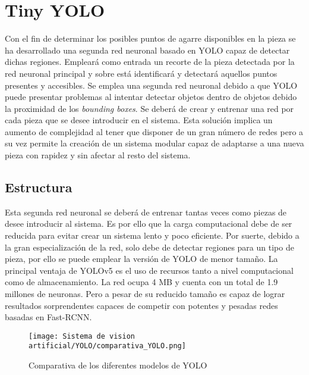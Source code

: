 \newpage
\section{Tiny YOLO}
\label{chap:Sistema de visión artificial sec:Tiny YOLO}
Con el fin de determinar los posibles puntos de agarre disponibles en la pieza se ha desarrollado una segunda red neuronal basado en YOLO capaz de detectar dichas regiones. Empleará como entrada un recorte de la pieza detectada por la red neuronal principal y sobre está identificará y detectará aquellos puntos presentes y accesibles. Se emplea una segunda red neuronal debido a que YOLO puede presentar problemas al intentar detectar objetos dentro de objetos debido  la proximidad de los \textit{bounding boxes}. Se deberá de crear y entrenar una red por cada pieza que se desee introducir en el sistema. Esta solución implica un aumento de complejidad al tener que disponer de un gran número de redes pero a su vez permite la creación de un sistema modular capaz de adaptarse a una nueva pieza con rapidez y sin afectar al resto del sistema.

\subsection{Estructura}
\label{chap:Sistema de visión artificial subsec:Tiny YOLO Estructura}
Esta segunda red neuronal se deberá de entrenar tantas veces como piezas de desee introducir al sistema. Es por ello que la carga computacional debe de ser reducida para evitar crear un sistema lento y poco eficiente. Por suerte, debido a la gran especialización de la red, solo debe de detectar regiones para un tipo de pieza, por ello se puede emplear la versión de YOLO de menor tamaño. La principal ventaja de YOLOv5 es el uso de recursos tanto a nivel computacional como de almacenamiento. La red ocupa 4 MB y cuenta con un total de 1.9 millones de neuronas. Pero a pesar de su reducido tamaño es capaz de lograr resultados sorprendentes capaces de competir con potentes y pesadas redes basadas en Fast-RCNN.

\begin{figure}[ht]
	\centering
	\texttt{[image: Sistema de vision artificial/YOLO/comparativa\_YOLO.png]}
	\caption{Comparativa de los diferentes modelos de YOLO}
	\label{chap:Sistema de visión artificial fig:Comparativa YOLO}
\end{figure}

